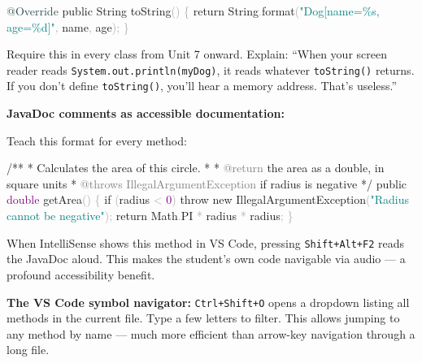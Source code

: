 \documentclass[
  justified,
  openright,
]{tufte-book}
\newcommand{\AnnotationTok}[1]{\textcolor{Gray}{#1}}
\newcommand{\AttributeTok}[1]{\textcolor{DarkSlateGray}{#1}}
\newcommand{\BuiltInTok}[1]{#1}
\newcommand{\CommentTok}[1]{\textcolor{MidGray}{#1}}
\newcommand{\ControlFlowTok}[1]{\textcolor{BrandBlue}{#1}}
\newcommand{\DataTypeTok}[1]{\textcolor{Purple}{#1}}
\newcommand{\DecValTok}[1]{\textcolor{Purple}{#1}}
\newcommand{\FunctionTok}[1]{\textcolor{BrandBlue}{#1}}
\newcommand{\KeywordTok}[1]{\textcolor{BrandBlue}{#1}}
\newcommand{\NormalTok}[1]{#1}
\newcommand{\OperatorTok}[1]{\textcolor{DarkGray}{#1}}
\newcommand{\SpecialCharTok}[1]{\textcolor{Teal}{#1}}
\newcommand{\StringTok}[1]{\textcolor{Teal}{#1}}
\newenvironment{Shaded}{%
  \begin{snugshade}
}{%
  \end{snugshade}
}
\begin{document}
\begin{Shaded}
\begin{Highlighting}[]
\AttributeTok{@Override}
\KeywordTok{public} \BuiltInTok{String} \FunctionTok{toString}\OperatorTok{()} \OperatorTok{\{}
    \ControlFlowTok{return} \BuiltInTok{String}\OperatorTok{.}\FunctionTok{format}\OperatorTok{(}\StringTok{"Dog[name=}\SpecialCharTok{\%s}\StringTok{, age=}\SpecialCharTok{\%d}\StringTok{]"}\OperatorTok{,}\NormalTok{ name}\OperatorTok{,}\NormalTok{ age}\OperatorTok{);}
\OperatorTok{\}}
\end{Highlighting}
\end{Shaded}

Require this in every class from Unit 7 onward. Explain: ``When your
screen reader reads \texttt{System.out.println(myDog)}, it reads
whatever \texttt{toString()} returns. If you don't define
\texttt{toString()}, you'll hear a memory address. That's useless.''

\textbf{JavaDoc comments as accessible documentation:}

Teach this format for every method:

\begin{Shaded}
\begin{Highlighting}[]
\CommentTok{/**}
 \CommentTok{*}\NormalTok{ Calculates the area of this circle}\CommentTok{.}
 \CommentTok{*}
 \CommentTok{*} \AnnotationTok{@return}\NormalTok{ the area as a double}\CommentTok{,}\NormalTok{ in square units}
 \CommentTok{*} \AnnotationTok{@throws}\CommentTok{ }\AnnotationTok{IllegalArgumentException}\CommentTok{ }\NormalTok{if radius is negative}
 \CommentTok{*/}
\KeywordTok{public} \DataTypeTok{double} \FunctionTok{getArea}\OperatorTok{()} \OperatorTok{\{}
    \ControlFlowTok{if} \OperatorTok{(}\NormalTok{radius }\OperatorTok{\textless{}} \DecValTok{0}\OperatorTok{)} \ControlFlowTok{throw} \KeywordTok{new} \BuiltInTok{IllegalArgumentException}\OperatorTok{(}\StringTok{"Radius cannot be negative"}\OperatorTok{);}
    \ControlFlowTok{return} \BuiltInTok{Math}\OperatorTok{.}\FunctionTok{PI} \OperatorTok{*}\NormalTok{ radius }\OperatorTok{*}\NormalTok{ radius}\OperatorTok{;}
\OperatorTok{\}}
\end{Highlighting}
\end{Shaded}

When IntelliSense shows this method in VS Code, pressing
\texttt{Shift+Alt+F2} reads the JavaDoc aloud. This makes the student's
own code navigable via audio --- a profound accessibility benefit.

\textbf{The VS Code symbol navigator:} \texttt{Ctrl+Shift+O} opens a
dropdown listing all methods in the current file. Type a few letters to
filter. This allows jumping to any method by name --- much more
efficient than arrow-key navigation through a long file.
\end{document}
